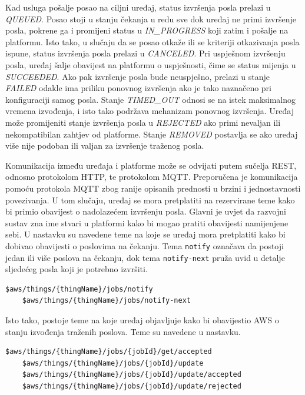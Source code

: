 Kad usluga pošalje posao na ciljni uređaj, status izvršenja posla prelazi u \textit{QUEUED}. Posao stoji u stanju čekanja u redu sve dok uređaj ne primi izvršenje posla, pokrene ga i promijeni status u \textit{IN\_PROGRESS} koji zatim i pošalje na platformu. Isto tako, u slučaju da se posao otkaže ili se kriteriji otkazivanja posla ispune, status izvršenja posla prelazi u \textit{CANCELED}. Pri uspješnom izvršenju posla, uređaj šalje obavijest na platformu o uspješnosti, čime se status mijenja u \textit{SUCCEEDED}. Ako pak izvršenje posla bude neuspješno, prelazi u stanje \textit{FAILED} odakle ima priliku ponovnog izvršenja ako je tako naznačeno pri konfiguraciji samog posla. Stanje \textit{TIMED\_OUT} odnosi se na istek maksimalnog vremena izvođenja, i isto tako podržava mehanizam ponovnog izvršenja. Uređaj može promijeniti stanje izvršenja posla u \textit{REJECTED} ako primi nevaljan ili nekompatibilan zahtjev od platforme. Stanje \textit{REMOVED} postavlja se ako uređaj više nije podoban ili valjan za izvršenje traženog posla. 

Komunikacija između uređaja i platforme može se odvijati putem sučelja REST, odnosno protokolom HTTP, te protokolom MQTT. Preporučena je komunikacija pomoću protokola MQTT zbog ranije opisanih prednosti u brzini i jednostavnosti povezivanja. U tom slučaju, uređaj se mora pretplatiti na rezervirane teme kako bi primio obavijest o nadolazećem izvršenju posla. Glavni je uvjet da razvojni sustav zna ime stvari u platformi kako bi mogao pratiti obavijesti namijenjene sebi. U nastavku su navedene teme na koje se uređaj mora pretplatiti kako bi dobivao obavijesti o poslovima na čekanju. Tema \lstinline|notify| označava da postoji jedan ili više poslova na čekanju, dok tema \lstinline|notify-next| pruža uvid u detalje sljedećeg posla koji je potrebno izvršiti. 

\begin{lstlisting}[caption={Teme za obavijesti o poslovima}]
	$aws/things/{thingName}/jobs/notify
	$aws/things/{thingName}/jobs/notify-next
\end{lstlisting}

Isto tako, postoje teme na koje uređaj objavljuje kako bi obavijestio AWS o stanju izvođenja traženih poslova. Teme su navedene u nastavku.

\begin{lstlisting}[caption={Teme za obavijesti o izvođenju poslova}]
	$aws/things/{thingName}/jobs/{jobId}/get/accepted
	$aws/things/{thingName}/jobs/{jobId}/update
	$aws/things/{thingName}/jobs/{jobId}/update/accepted
	$aws/things/{thingName}/jobs/{jobId}/update/rejected
\end{lstlisting}

